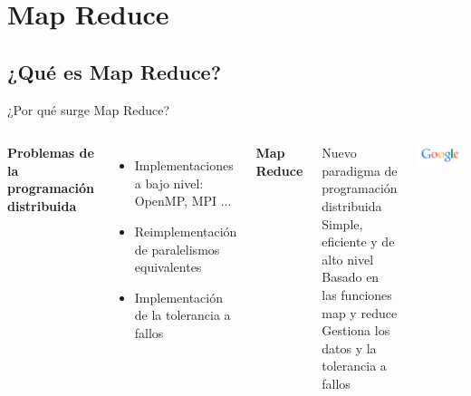 
\section{Map Reduce}

	\subsection*{¿Qué es Map Reduce?}

		\begin{frame}{¿Por qué surge Map Reduce?}
			
				
			\begin{columns}
					\fontsize{10}{8}\selectfont	
					{\centering\color{TurkishRose}\textbf{Problemas de la programación distribuida}}
					\fontsize{9}{8}\selectfont	
					\begin{itemize}
						\item Implementaciones a bajo nivel: OpenMP, MPI ...
						\item Reimplementación de paralelismos equivalentes
						\item Implementación de la tolerancia a fallos
					\end{itemize}
					\kern3mm
					\fontsize{10}{8}\selectfont	
					{\centering\color{ChetwodeBlue}\textbf{Map Reduce}}
					\fontsize{9}{8}\selectfont	
					\begin{itemize}
						\MyPitem Nuevo paradigma de programación distribuida
						\MyPitem Simple, eficiente y de alto nivel
						\MyPitem Basado en las funciones map y reduce
						\MyPitem Gestiona los datos y la tolerancia a fallos
					\end{itemize}
				
					\includegraphics[width=\textwidth]{./Images/google.png}
					

\end{columns}
\end{frame}
